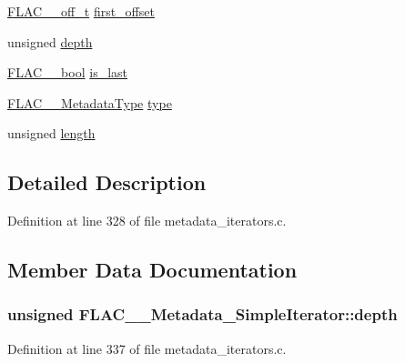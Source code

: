 \begin{DoxyCompactItemize}
\item 
\hyperlink{libflac_2include_2share_2compat_8h_a125fb0105eee035da35c6a4999d140eb}{F\+L\+A\+C\+\_\+\+\_\+off\+\_\+t} \hyperlink{struct_f_l_a_c_____metadata___simple_iterator_a7dfbfb6960963a98f3e3981a629c8a30}{first\+\_\+offset}
\item 
unsigned \hyperlink{struct_f_l_a_c_____metadata___simple_iterator_a2a5f541a50551270410d6c712b49e0da}{depth}
\item 
\hyperlink{ordinals_8h_a95103469f1cbd78b8cf250194985b34e}{F\+L\+A\+C\+\_\+\+\_\+bool} \hyperlink{struct_f_l_a_c_____metadata___simple_iterator_a8abf4250a003560d4931310e0a783ee7}{is\+\_\+last}
\item 
\hyperlink{group__flac__format_gac71714ba8ddbbd66d26bb78a427fac01}{F\+L\+A\+C\+\_\+\+\_\+\+Metadata\+Type} \hyperlink{struct_f_l_a_c_____metadata___simple_iterator_a535f07e2930ad28d41b69eddffb1a62c}{type}
\item 
unsigned \hyperlink{struct_f_l_a_c_____metadata___simple_iterator_ad7707b32695d73a1abded2ad9f7b7928}{length}
\end{DoxyCompactItemize}


\subsection{Detailed Description}


Definition at line 328 of file metadata\+\_\+iterators.\+c.



\subsection{Member Data Documentation}
\subsubsection[{\texorpdfstring{depth}{depth}}]{\setlength{\rightskip}{0pt plus 5cm}unsigned F\+L\+A\+C\+\_\+\+\_\+\+Metadata\+\_\+\+Simple\+Iterator\+::depth}\hypertarget{struct_f_l_a_c_____metadata___simple_iterator_a2a5f541a50551270410d6c712b49e0da}{}\label{struct_f_l_a_c_____metadata___simple_iterator_a2a5f541a50551270410d6c712b49e0da}


Definition at line 337 of file metadata\+\_\+iterators.\+c.


